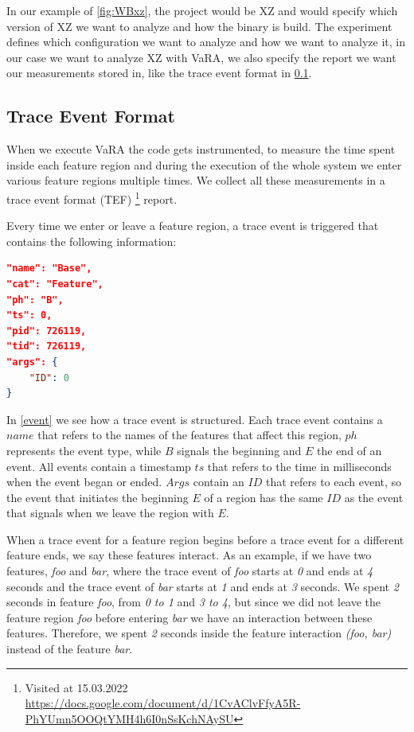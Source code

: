 In our example of \autoref{fig:WBxz}, the project would be XZ and would specify which version of XZ we want to analyze and how the binary is build.
The experiment defines which configuration we want to analyze and how we want to analyze it, in our case we want to analyze 
XZ with VaRA, we also specify the report we want our measurements stored in, like the trace event format in \ref{trace-event}.

\subsection{Trace Event Format}\label{trace-event}
When we execute VaRA the code gets instrumented, to measure the time spent inside each feature region and during the execution of the 
whole system we enter various feature regions multiple times.
We collect all these measurements
in a trace event format (TEF) \footnote{Visited at 15.03.2022 \\ \url{https://docs.google.com/document/d/1CvAClvFfyA5R-PhYUmn5OOQtYMH4h6I0nSsKchNAySU}} report.

Every time we enter or leave a feature region, a trace event is triggered that contains the following information:\\

\begin{minipage}{\linewidth}
\begin{lstlisting}[caption={Trace event},captionpos=b,language=json,firstnumber=1,label={event}]
"name": "Base",
"cat": "Feature",
"ph": "B",
"ts": 0,
"pid": 726119,
"tid": 726119,
"args": {
    "ID": 0
}
\end{lstlisting}
\end{minipage}

In \autoref{event} we see how a trace event is structured. Each trace event contains a $name$ that refers to the names of the features that affect this
region, $ph$ represents the event type, while $B$ signals the beginning and $E$ the end of an event.
All events contain a timestamp $ts$ that refers to the time in milliseconds when the event began or ended.
$Args$ contain an $ID$ that refers to each event, so the event that initiates the beginning $E$ of a region has the same $ID$ as the event that signals when
we leave the region with $E$.

When a trace event for a feature region begins before a trace event for a different feature ends, we say these features interact. 
As an example, if we have two features, \emph{foo} and \emph{bar}, where the trace event of \emph{foo} starts at \emph{0} and ends at \emph{4} seconds 
and the trace event of \emph{bar} starts at \emph{1} and ends at \emph{3} seconds. We spent \emph{2} seconds in feature \emph{foo}, 
from \emph{0 to 1} and \emph{3 to 4}, 
but since we did not leave the feature region \emph{foo} before entering \emph{bar} we have an interaction between these features. 
Therefore, we spent \emph{2} seconds inside the feature interaction \emph{(foo, bar)} instead of the feature \emph{bar}.

